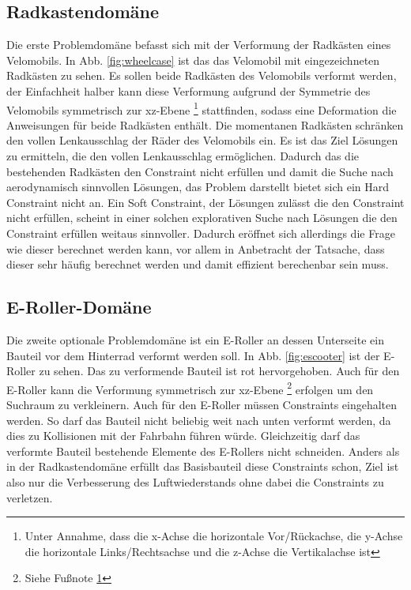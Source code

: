 \documentclass[12pt]{article}
\begin{document}
\subsection{Radkastendomäne}

Die erste Problemdomäne befasst sich mit der Verformung der Radkästen eines Velomobils. 
In Abb. \ref{fig:wheelcase} ist das das Velomobil mit eingezeichneten Radkästen zu sehen.
Es sollen beide Radkästen des Velomobils verformt werden, der Einfachheit halber kann diese Verformung aufgrund der Symmetrie des Velomobils symmetrisch zur xz-Ebene
\footnote{\label{foot:coords} Unter Annahme, dass die x-Achse die horizontale Vor/Rückachse, die y-Achse die horizontale Links/Rechtsachse und die z-Achse die Vertikalachse ist} stattfinden, sodass eine Deformation die Anweisungen für beide Radkästen enthält.
Die momentanen Radkästen schränken den vollen Lenkausschlag der Räder des Velomobils ein.
Es ist das Ziel Lösungen zu ermitteln, die den vollen Lenkausschlag ermöglichen.
Dadurch das die bestehenden Radkästen den Constraint nicht erfüllen und damit die Suche nach aerodynamisch sinnvollen Lösungen, das Problem darstellt bietet sich ein Hard Constraint nicht an.
Ein Soft Constraint, der Lösungen zulässt die den Constraint nicht erfüllen, scheint in einer solchen explorativen Suche nach Lösungen die den Constraint erfüllen weitaus sinnvoller.
Dadurch eröffnet sich allerdings die Frage wie dieser berechnet werden kann, vor allem in Anbetracht der Tatsache, dass dieser sehr häufig berechnet werden und damit effizient berechenbar sein muss.

                      
\subsection{E-Roller-Domäne}

Die zweite optionale Problemdomäne ist ein E-Roller an dessen Unterseite ein Bauteil vor dem Hinterrad verformt werden soll.
In Abb. \ref{fig:escooter} ist der E-Roller zu sehen. Das zu verformende Bauteil ist rot hervorgehoben.
Auch für den E-Roller kann die Verformung symmetrisch zur xz-Ebene \footnote{Siehe Fußnote \ref{foot:coords}} erfolgen um den Suchraum zu verkleinern.
Auch für den E-Roller müssen Constraints eingehalten werden. 
So darf das Bauteil nicht beliebig weit nach unten verformt werden, da dies zu Kollisionen mit der Fahrbahn führen würde.
Gleichzeitig darf das verformte Bauteil bestehende Elemente des E-Rollers nicht schneiden.
Anders als in der Radkastendomäne erfüllt das Basisbauteil diese Constraints schon, Ziel ist also nur die Verbesserung des Luftwiederstands ohne dabei die Constraints zu verletzen.
 
\end{document}
